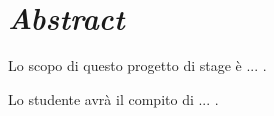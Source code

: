 \section*{\textit{Abstract}}
Lo scopo di questo progetto di stage è ... .

Lo studente avrà il compito di ... .

\newpage